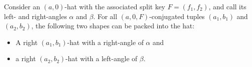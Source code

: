 \documentclass[a4paper,style=print,bibliography=totoc,nexus,lnum,extramargin]{tubsbook}
\begin{document}

\begin{lemma}\label{th:hats-in-hat}
    Consider an $(a,0)$-hat with the associated split key $F = (f_1, f_2)$, and call its left- and right-angles $\alpha$ and $\beta$.
    For all $(a,0,F)$-conjugated tuples $(a_1, b_1)$ and $(a_2, b_2)$, the following two shapes can be packed into the hat:
    \begin{itemize}
        \item A right $(a_1,b_1)$-hat with a right-angle of $\alpha$ and
        \item a right $(a_2,b_2)$-hat with a left-angle of $\beta$.
    \end{itemize}
\end{lemma}
\end{document}
